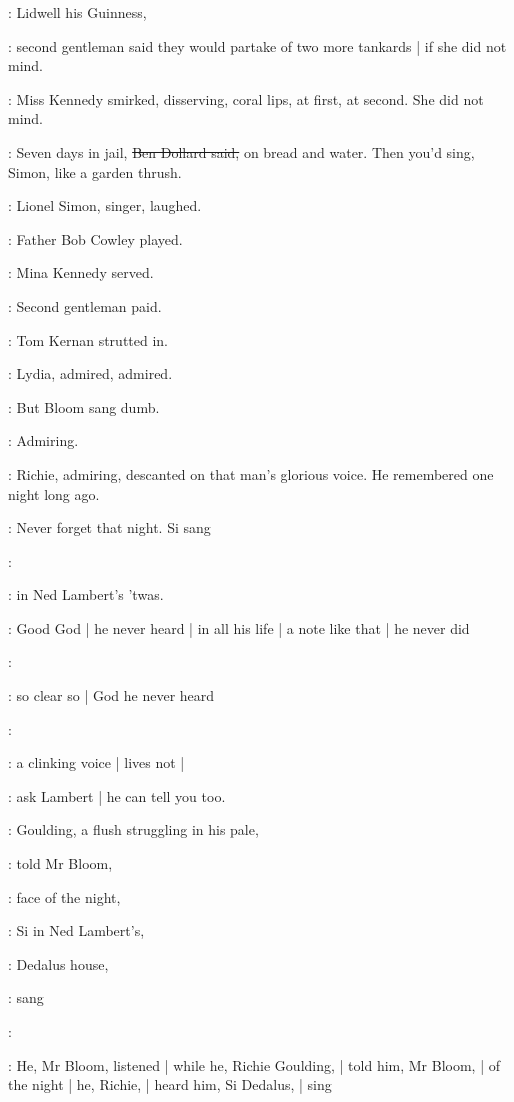 :
Lidwell his Guinness,

:
second gentleman said they would partake of two more tankards |
if she did not mind.

:
Miss Kennedy smirked,
disserving,
coral lips,
at first,
at second.
She did not mind.

\dollard:
Seven days in jail,
\sout{Ben Dollard said,}
on bread and water.
Then you'd sing,
Simon,
like a garden thrush.

:
Lionel Simon,
singer,
laughed.

:
Father Bob Cowley played.

:
Mina Kennedy served.

:
Second gentleman paid.

:
Tom Kernan strutted in.

:
Lydia,
admired,
admired.

:
But Bloom sang dumb.

:
Admiring.

:
Richie,
admiring,
descanted on that man's glorious voice.
He remembered one night long ago.

\goulding:
Never forget that night.
Si sang

\simon:

\goulding:
in Ned Lambert's 'twas.

:
Good God |
he never heard |
in all his life |
a note like that |
he never did

\simon:

:
so clear so |
God he never heard

\simon:

:
a clinking voice |
lives not |

\goulding:
ask Lambert |
he can tell you too.

:
Goulding,
a flush struggling in his pale,

:
told Mr Bloom,

:
face of the night,

\goulding:
Si in Ned Lambert's,

:
Dedalus house,

\goulding:
sang

\simon:

:
He,
Mr Bloom,
listened |
while he,
Richie Goulding, |
told him,
Mr Bloom, |
of the night |
he,
Richie, |
heard him,
Si Dedalus, |
sing

